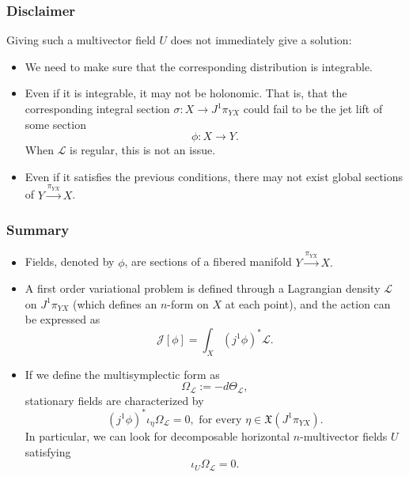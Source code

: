 \begin{frame}
    \frametitle{Disclaimer}
    Giving such a multivector field $U$ does not immediately give a solution:
    \begin{itemize}
        \item We need to make sure that the corresponding distribution is integrable.
        \item Even if it is integrable, it may not be holonomic. That is, that the corresponding 
        integral section $\sigma: X \rightarrow J^1 \pi_{YX}$ could fail to be the jet lift of some section $$\phi: X \rightarrow Y.$$
        When $\mathcal{L}$ is \alert{regular,} this is not an issue.
        \item Even if it satisfies the previous conditions, there may not exist global sections of $Y \xrightarrow{\pi_{YX}} X$.
    \end{itemize}
\end{frame}

\begin{frame}
    \frametitle{Summary}
    \begin{itemize}
        \item Fields, denoted by $\phi$, are sections of a fibered manifold $Y \xrightarrow{\pi_{YX}} X.$
        \item A first order variational problem is defined through a Lagrangian density $\mathcal{L}$ 
         on $J^1 \pi_{YX}$ (which defines an $n$-form on $X$ at each point), and the action can be expressed as
        $$\mathcal{J}[\phi] = \int_X (j^1 \phi)^\ast \mathcal{L}.$$
        \item If we define the \alert{multisymplectic form} as $$\Omega_\mathcal{L} := -d \Theta_\mathcal{L},$$
        stationary fields are characterized by $$(j^1 \phi)^\ast \iota_{\eta} \Omega_\mathcal{L} = 0, \,\, \text{for every } \eta \in \mathfrak{X}(J^1 \pi_{YX}).$$
        In particular, we can look for decomposable horizontal $n$-multivector fields $U$ satisfying $$\iota_U \Omega_\mathcal{L} = 0.$$
    \end{itemize}
\end{frame}
